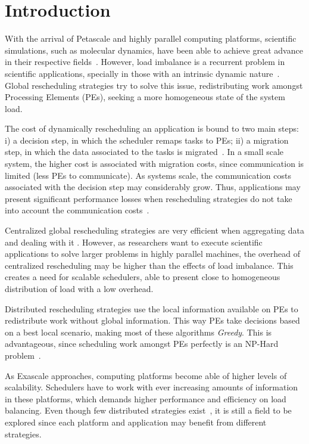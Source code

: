 \section{Introduction}

With the arrival of Petascale and highly parallel computing platforms, scientific simulations, such as molecular dynamics, have been able to achieve great advance in their respective fields~\cite{namd,IPDPS13:LULESH}.
However, load imbalance is a recurrent problem in scientific applications, specially in those with an intrinsic dynamic nature~\cite{Deveci2015}.
Global rescheduling strategies try to solve this issue, redistributing work amongst Processing Elements (PEs), seeking a more homogeneous state of the system load.

The cost of dynamically rescheduling an application is bound to two main steps: i) a decision step, in which the scheduler remaps tasks to PEs; ii) a migration step, in which the data associated to the tasks is migrated~\cite{pillaphd}.
In a small scale system, the higher cost is associated with migration costs, since communication is limited (less PEs to communicate).
As systems scale, the communication costs associated with the decision step may considerably grow. Thus, applications may present significant performance losses when rescheduling strategies do not take into account the communication costs~\cite{grapevine}.

Centralized global rescheduling strategies are very efficient when aggregating data and dealing with it . %
However, as researchers want to execute scientific applications to solve larger problems in highly parallel machines, the overhead of centralized rescheduling may be higher than the effects of load imbalance.
This creates a need for scalable schedulers, able to present close to homogeneous distribution of load with a low overhead.

Distributed rescheduling strategies use the local information available on PEs to redistribute work without global information.
This way PEs take decisions based on a best local scenario, making most of these algorithms \textit{Greedy}.
This is advantageous, since scheduling work amongst PEs perfectly is an NP-Hard problem~\cite{npcomplete}.

As Exascale approaches, computing platforms become able of higher levels of scalability.
Schedulers have to work with ever increasing amounts of information in these platforms, which demands higher performance and efficiency on load balancing.
Even though few distributed strategies exist~\cite{grapevine,diffus}, it is still a field to be explored since each platform and application may benefit from different strategies.


